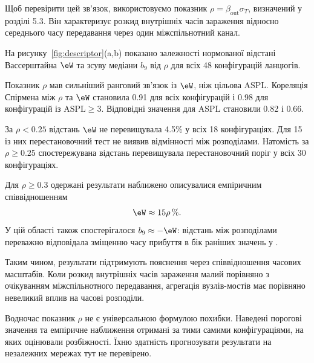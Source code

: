 Щоб перевірити цей зв'язок,
використовуємо показник
$\rho=\beta_{\mathrm{out}}\sigma_T$,
визначений у розділі 5.3.
Він характеризує розкид
внутрішніх часів зараження
відносно середнього часу
передавання через один
міжспільнотний канал.

На рисунку~\ref{fig:descriptor}(a,b)
показано залежності нормованої
відстані Вассерштайна $\eW$
та зсуву медіани $b_9$
від $\rho$ для всіх
48 конфігурацій ланцюгів.

Показник $\rho$ мав сильніший
ранговий зв'язок із $\eW$,
ніж цільова ASPL.
Кореляція Спірмена між
$\rho$ та $\eW$ становила
0.91 для всіх конфігурацій
і 0.98 для конфігурацій
із $\mathrm{ASPL}\geq3$.
Відповідні значення
для ASPL становили 0.82 і 0.66.

За $\rho<0.25$ відстань $\eW$
не перевищувала 4.5\%
у всіх 18 конфігураціях.
Для 15 із них перестановочний
тест не виявив відмінності
між розподілами.
Натомість за $\rho\geq0.25$
спостережувана відстань
перевищувала перестановочний
поріг у всіх 30 конфігураціях.

Для $\rho\geq0.3$
одержані результати наближено
описувалися емпіричним
співвідношенням
\begin{equation}
\eW \approx 15\rho\,\%.
\end{equation}
У цій області також
спостерігалося
$b_9\approx-\eW$:
відстань між розподілами
переважно відповідала
зміщенню часу прибуття
в бік раніших значень
у \TS{}.

Таким чином, результати
підтримують пояснення
через співвідношення
часових масштабів.
Коли розкид внутрішніх
часів зараження малий
порівняно з очікуванням
міжспільнотного передавання,
агрегація вузлів-мостів
має порівняно невеликий
вплив на часові розподіли.

Водночас показник $\rho$
не є універсальною формулою
похибки. Наведені порогові
значення та емпіричне
наближення отримані
за тими самими конфігураціями,
на яких оцінювали розбіжності.
Їхню здатність прогнозувати
результати на незалежних
мережах тут не перевірено.

